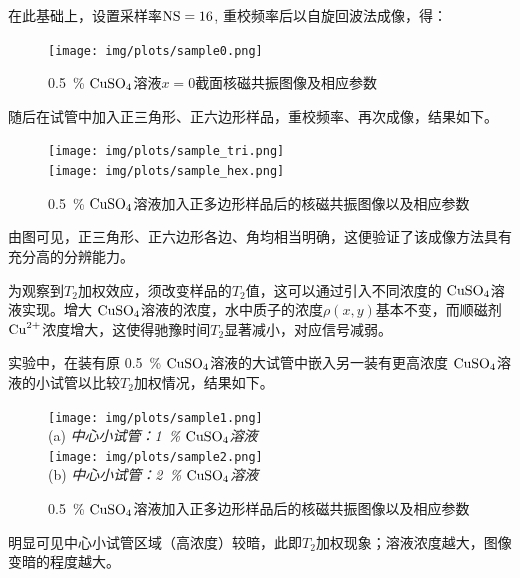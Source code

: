 \documentclass[aps,pre,12pt,preprint,%
	onecolumn,showpacs,showkeys,nofootinbib]{revtex4-1}
\newcommand{\cuSample}{$\mrm{CuSO_4}$溶液}
\newcommand{\perc}[1]{\SI{#1}{\percent}}
\begin{document}
	在此基础上，设置采样率$\textup{NS} = 16$, 重校频率后以自旋回波法成像，得：
	\begin{figure}[!ht]
	\centering
	\texttt{[image: img/plots/sample0.png]}
	\caption{\perc{.5} \cuSample $x = 0$截面核磁共振图像及相应参数}
	\vspace{-1ex}
	\end{figure}
\FloatBarrier\noindent%
	随后在试管中加入正三角形、正六边形样品，重校频率、再次成像，结果如下。
\clearpage
	
	\begin{figure}[!ht]
	\vspace{-2ex}
	\centering
	\texttt{[image: img/plots/sample\_tri.png]}\\[1.5ex]
	\texttt{[image: img/plots/sample\_hex.png]}\\[1ex]
	\caption{\perc{.5} \cuSample 加入正多边形样品后的核磁共振图像以及相应参数}
	\vspace{-2ex}
	\end{figure}
	
	由图可见，正三角形、正六边形各边、角均相当明确，这便验证了该成像方法具有充分高的分辨能力。
	
	为观察到$T_2$加权效应，须改变样品的$T_2$值，这可以通过引入不同浓度的 \cuSample 实现。增大 \cuSample 的浓度，水中质子的浓度$\rho(x,y)$基本不变，而顺磁剂$\mathrm{Cu}^{2+}$浓度增大，这使得驰豫时间$T_2$显著减小，对应信号减弱。
\clearpage
	
	实验中，在装有原 \perc{.5} \cuSample 的大试管中嵌入另一装有更高浓度 \cuSample 的小试管以比较$T_2$加权情况，结果如下。
	\begin{figure}[!ht]
	\vspace{1ex}
	\centering\small
	\texttt{[image: img/plots/sample1.png]}\\[1ex]
	(a) \textit{中心小试管：\perc{1} \cuSample}\\[3ex]
	\texttt{[image: img/plots/sample2.png]}\\[1ex]
	(b) \textit{中心小试管：\perc{2} \cuSample}\\[1ex]
	\caption{\perc{.5} \cuSample 加入正多边形样品后的核磁共振图像以及相应参数}
	\vspace{0ex}
	\end{figure}
\FloatBarrier
\clearpage
	
	明显可见中心小试管区域（高浓度）较暗，此即$T_2$加权现象；溶液浓度越大，图像变暗的程度越大。
\end{document}
